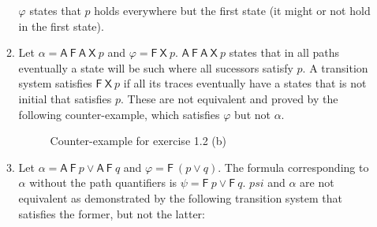 \documentclass[12pt]{article}
\begin{document}
\begin{enumerate}[label=\roman*.]
\begin{enumerate}[label=(\alph*)]
    $\varphi$ states that $p$ holds everywhere but the first state (it might or not hold in the first state).

  \item Let $\alpha = \mathsf{A}~\mathsf{F}~\mathsf{A}~\mathsf{X}~p$ and $\varphi = \mathsf{F}~\mathsf{X}~p$.
    $\mathsf{A}~\mathsf{F}~\mathsf{A}~\mathsf{X}~p$ states that in all paths eventually a state will be such where all sucessors satisfy $p$.
    A transition system satisfies $\mathsf{F}~\mathsf{X}~p$ if all its traces eventually have a states that is not initial that satisfies $p$.
    These are not equivalent and proved by the following counter-example, which satisfies $\varphi$ but not $\alpha$.

    \begin{figure}[ht]
      \centering
      \caption{Counter-example for exercise 1.2 (b)}
      \label{fig:1-2-b}
    \end{figure}

  \item Let $\alpha = \mathsf{A}~\mathsf{F}~p \vee \mathsf{A}~\mathsf{F}~q$ and $\varphi = \mathsf{F}~(p \vee q)$.
    The formula corresponding to $\alpha$ without the path quantifiers is $\psi = \mathsf{F}~p \vee \mathsf{F}~q$.
    $psi$ and $\alpha$ are not equivalent as demonstrated by the following transition system that satisfies the former, but not the latter:

    \begin{figure}[ht]
      \centering
\end{figure}
\end{enumerate}
\end{enumerate}
\end{document}
